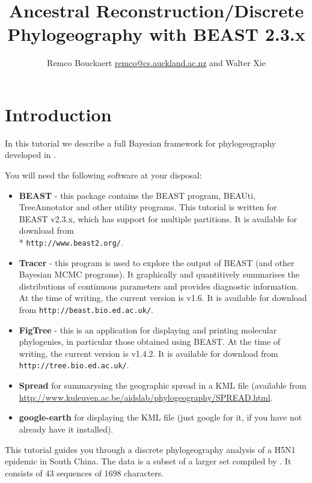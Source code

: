 \documentclass{article}
\newcommand{\BEASTVersion}{2.3.x}
\newcommand{\TracerVersion}{1.6}
\newcommand{\FigTreeVersion}{1.4.2}
\begin{document}
\title{Ancestral Reconstruction/Discrete Phylogeography with BEAST {\BEASTVersion}}
\author{Remco Bouckaert \url{remco@cs.auckland.ac.nz} and Walter Xie}
\maketitle

\section{Introduction}


In this tutorial we describe a full Bayesian framework for phylogeography developed in \cite{Lemey:2009uq}.

You will need the following software at your disposal:

\begin{itemize}

\item {\bf BEAST} - this package contains the BEAST program, BEAUti, TreeAnnotator and other utility programs. This tutorial is written for BEAST v{\BEASTVersion}, which has support for multiple partitions. It is available for download from \\* \texttt{http://www.beast2.org/}.
\item {\bf Tracer} - this program is used to explore the output of BEAST (and other Bayesian MCMC programs). It graphically and
quantitively summarises the distributions of continuous parameters and provides diagnostic information. At the time of
writing, the current version is v{\TracerVersion}. It is available for download from \texttt{http://beast.bio.ed.ac.uk/}.
\item {\bf FigTree} - this is an application for displaying and printing molecular phylogenies, in particular those obtained using
BEAST. At the time of writing, the current version is v{\FigTreeVersion}. It is available for download from \texttt{http://tree.bio.ed.ac.uk/}.
\item {\bf Spread} for summarysing the geographic spread in a KML file (available from \url{http://www.kuleuven.ac.be/aidslab/phylogeography/SPREAD.html}.
\item {\bf google-earth} for displaying the KML file (just google for it, if you have not already have it installed).
\end{itemize}


This tutorial guides you through a discrete phylogeography analysis of a H5N1 epidemic in South China.
The data is a subset of a larger set compiled by \cite{wallace:2007st}.
It consists of 43 sequences of 1698 characters.
\end{document}
